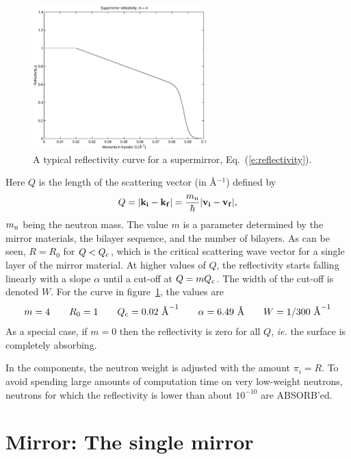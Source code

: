 \begin{figure}
  \begin{center}
    \includegraphics[width=0.6\textwidth]{figures/supermirror.eps}
  \end{center}
\caption{A typical reflectivity curve for a supermirror,
Eq.~(\protect\ref{e:reflectivity}).}
\label{f:reflectivity}
\end{figure}
Here $Q$ is the length of the scattering vector (in \AA$^{-1}$)
defined by
\begin{equation} \label{e:reflectivity}
Q = |{\bf k}_{\bf i} - {\bf k}_{\bf f}| 
  = \frac{m_{\rm n}}{\hbar} |{\bf v}_{\bf i} - {\bf v}_{\bf f}|, 
\end{equation}
$m_{\rm n}$ being the neutron mass. 
The value $m$ is a parameter determined by the mirror materials,
the bilayer sequence, and the number of bilayers.
As can be seen, $R=R_0$ for $Q < Q_{\rm c}$, which is the
critical scattering wave vector for a single layer of the mirror
material. At higher values of $Q$, the reflectivity starts falling
linearly with a slope $\alpha$ until a cut-off at $Q = m Q_{\rm c}$. 
The width of the cut-off is denoted $W$. For the curve in
figure~\ref{f:reflectivity}, the values are
$$ m=4 \qquad R_0=1 \qquad Q_{\rm c} = 0.02\mbox{ \AA}^{-1} \qquad
   \alpha = 6.49\mbox{ \AA} \qquad W=1/300\mbox{ \AA}^{-1} $$
As a special case, if $m=0$ then the reflectivity is zero for all $Q$,
   \textit{ie.} the surface is completely absorbing.

In the components, the neutron weight is adjusted with the amount $\pi_i = R$. 
To avoid spending large amounts of computation time on very low-weight
neutrons, neutrons for which the reflectivity is lower than about
$10^{-10}$ are ABSORB'ed.

\section{Mirror: The single mirror}

